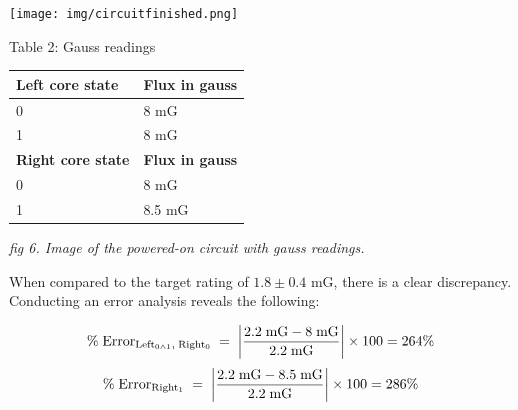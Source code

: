 \documentclass{article}
\begin{document}
\noindent
  \begin{minipage}[b]{0.5\linewidth}
  \centering
  \hspace*{-0.1cm}\vspace*{-2cm}\texttt{[image: img/circuitfinished.png]}
\end{minipage}\hfill
\begin{minipage}[b]{0.5\linewidth}
      \centering
      {\bfseries\strut Table 2: Gauss readings}
      \begin{tabular}{|l|l|}
      \hline
      \textbf{Left core state}  & \textbf{Flux in gauss} \\ \hline
      0                         & 8 mG                 \\ \hline
      1                         & 8 mG                 \\ \hline \hline
      \textbf{Right core state} & \textbf{Flux in gauss} \\ \hline
      0                         & 8 mG                 \\ \hline
      1                         & 8.5 mG                 \\ \hline
    \end{tabular}
\end{minipage}

\vspace{.3cm}

\begin{center} 
  \small\emph{fig 6. Image of the powered-on circuit with gauss readings.} 
\end{center}

\noindent When compared to the target rating of $1.8 \pm 0.4$ mG, there is a clear discrepancy. Conducting an error analysis reveals the following:

\[\% \; \mathrm{Error_{Left_{0\wedge1}, \; Right_0}} \; = \; \absolutevalue{\frac{2.2 \; \mathrm{mG} - 8 \; \mathrm{mG}}{2.2 \; \mathrm{mG}}} \times 100 = 264\%\] 
\[\% \; \mathrm{Error_{Right_1}} \; = \; \absolutevalue{\frac{2.2 \; \mathrm{mG} - 8.5 \; \mathrm{mG}}{2.2 \; \mathrm{mG}}} \times 100 = 286\%\] 
\end{document}
